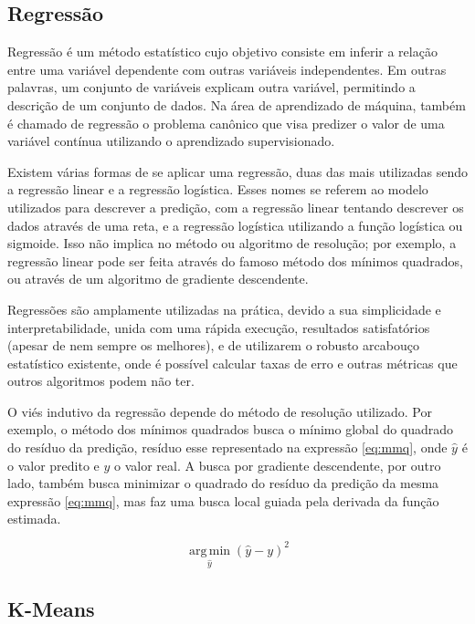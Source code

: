 \documentclass{article}
\begin{document}
\subsection{Regressão}

Regressão é um método estatístico cujo objetivo consiste em inferir a relação entre uma variável dependente com outras variáveis independentes.
Em outras palavras, um conjunto de variáveis explicam outra variável, permitindo a descrição de um conjunto de dados.
Na área de aprendizado de máquina, também é chamado de regressão o problema canônico
que visa predizer o valor de uma variável contínua utilizando o aprendizado supervisionado.

Existem várias formas de se aplicar uma regressão,
duas das mais utilizadas sendo a regressão linear e a regressão logística.
Esses nomes se referem ao modelo utilizados para descrever a predição,
com a regressão linear tentando descrever os dados através de uma reta,
e a regressão logística utilizando a função logística ou sigmoide.
Isso não implica no método ou algoritmo de resolução;
por exemplo, a regressão linear pode ser feita
através do famoso método dos mínimos quadrados,
ou através de um algoritmo de gradiente descendente.

Regressões são amplamente utilizadas na prática,
devido a sua simplicidade e interpretabilidade,
unida com uma rápida execução, resultados satisfatórios (apesar de nem sempre os melhores),
e de utilizarem o robusto arcabouço estatístico existente,
onde é possível calcular taxas de erro e outras métricas que outros algoritmos podem não ter.

O viés indutivo da regressão depende do método de resolução utilizado.
Por exemplo, o método dos mínimos quadrados busca o mínimo global
do quadrado do resíduo da predição, resíduo esse representado na expressão \ref{eq:mmq},
onde $\hat{y}$ é o valor predito e $y$ o valor real.
A busca por gradiente descendente, por outro lado,
também busca minimizar o quadrado do resíduo da predição da mesma expressão \ref{eq:mmq},
mas faz uma busca local guiada pela derivada da função estimada.

\begin{equation}
\operatorname*{arg\,min}_{\hat{y}} (\hat{y} - y)^2
\label{eq:mmq}
\end{equation}


\subsection{{K-Means}}
\end{document}
